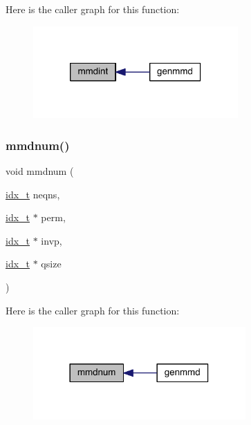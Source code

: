 Here is the caller graph for this function\+:\nopagebreak
\begin{figure}[H]
\begin{center}
\leavevmode
\includegraphics[width=222pt]{a00248_a58b398d038ac45f0c1ade19344820fcb_icgraph}
\end{center}
\end{figure}
\mbox{\label{a00248_afa97dfea17e36935c05b24c9b5db9726}} 
\subsubsection{\texorpdfstring{mmdnum()}{mmdnum()}}
{\footnotesize\ttfamily void mmdnum (\begin{DoxyParamCaption}\item[{\hyperlink{a00876_aaa5262be3e700770163401acb0150f52}{idx\+\_\+t}}]{neqns,  }\item[{\hyperlink{a00876_aaa5262be3e700770163401acb0150f52}{idx\+\_\+t} $\ast$}]{perm,  }\item[{\hyperlink{a00876_aaa5262be3e700770163401acb0150f52}{idx\+\_\+t} $\ast$}]{invp,  }\item[{\hyperlink{a00876_aaa5262be3e700770163401acb0150f52}{idx\+\_\+t} $\ast$}]{qsize }\end{DoxyParamCaption})}

Here is the caller graph for this function\+:\nopagebreak
\begin{figure}[H]
\begin{center}
\leavevmode
\includegraphics[width=230pt]{a00248_afa97dfea17e36935c05b24c9b5db9726_icgraph}
\end{center}
\end{figure}
\mbox{\label{a00248_ad2abd99ecd82dcbf67f2ae61600168e5}} 
